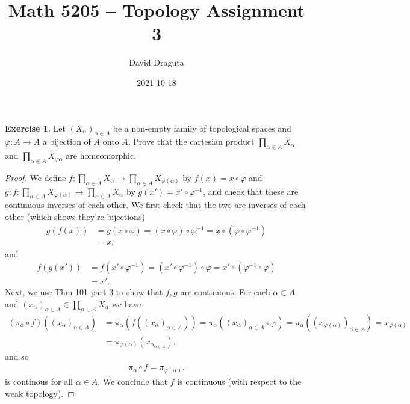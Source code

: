 \documentclass[12pt]{extarticle}
\title{ Math 5205 -- Topology Assignment 3}
\author{David Draguta}
\date{2021-10-18}
\newcommand{\<}{\langle}
\renewcommand{\>}{\rangle}
\theoremstyle{definition}
\newtheorem{exercise}{Exercise}
\begin{document}
\maketitle

\begin{exercise}
  Let $(X_{\alpha})_{\alpha \in A}$ be a non-empty family of topological spaces and $\varphi: A \to A$ a bijection of $A$ onto $A$. Prove that the cartesian product
  $\prod\limits_{\alpha \in A}X_{\alpha}$ and $\prod\limits_{\alpha \in A}X_{\varphi{\alpha}}$ are homeomorphic. 
\end{exercise}
\begin{proof}
  We define $f: \prod\limits_{\alpha \in A}X_{\alpha} \to \prod\limits_{\alpha \in A}X_{\varphi(\alpha)}$ by $ f(x) = x \circ \varphi$ and $g: f: \prod\limits_{\alpha \in A}X_{\varphi(\alpha)} \to \prod\limits_{\alpha \in A}X_{\alpha}$ by $g(x') = x' \circ \varphi^{-1}$, and check that these are continuous inverses of each other. We first check that the two are inverses of each other (which shows they're bijections)
  \begin{align*}
    g(f(x))  &= g(x \circ \varphi)     = (x \circ \varphi) \circ \varphi^{-1} = x \circ (\varphi \circ \varphi^{-1}) \\
    &= x, 
  \end{align*}
  and
  \begin{align*}
    f(g(x')) &= f(x'\circ \varphi^{-1}) = (x' \circ \varphi^{-1}) \circ \varphi = x' \circ (\varphi^{-1} \circ \varphi) \\
    &= x'.
  \end{align*}
  Next, we use Thm 101 part 3 to show that $f,g$ are continuous. For each $\alpha \in A$ and $(x_{\alpha})_{\alpha \in A} \in \prod\limits_{\alpha \in A}X_{\alpha}$ we have 
  \begin{align*}
    (\pi_\alpha \circ f)((x_{\alpha})_{\alpha \in A}) &= \pi_\alpha(f((x_{\alpha})_{\alpha \in A})) = \pi_{\alpha}((x_{\alpha})_{\alpha \in A} \circ \varphi) = \pi_{\alpha}((x_{\varphi(\alpha)})_{\alpha \in A}) = x_{\varphi(\alpha)} \\
    &= \pi_{\varphi(\alpha)}(x_{\alpha}_{\alpha \in A}),
  \end{align*}
  and so
  \begin{align*}
    \pi_{\alpha} \circ f  = \pi_{\varphi(\alpha)}.
  \end{align*}
  is continous for all $\alpha \in A$. We conclude that $f$ is continuous (with respect to the weak topology).


\end{proof}
\end{document}
